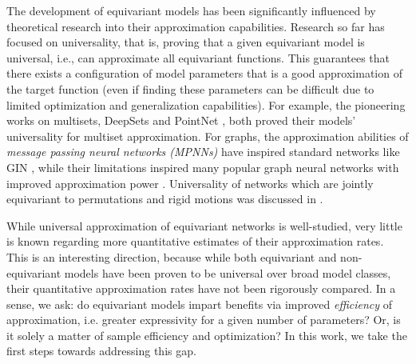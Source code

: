 \documentclass[twoside,11pt]{article}
\newcommand{\hl}[1]{\textcolor{blue}{#1}}
\begin{document}
The development of equivariant models has been significantly influenced by theoretical research into their approximation capabilities. Research so far has focused on universality, that is,   %
proving that a given equivariant model is universal, i.e., can approximate all equivariant functions. This guarantees that there exists a configuration of model parameters that is a good approximation of the target function (even if finding these parameters can be difficult due to limited optimization and generalization capabilities).  For example,  the pioneering works on multisets, DeepSets \citep{zaheer2017deep} and PointNet \citep{pointnet}, both proved their models' universality for multiset approximation. For graphs, the approximation abilities of \emph{message passing neural networks (MPNNs)} have inspired standard networks like GIN \citep{xu2018how}, while their limitations inspired many popular graph neural networks with improved approximation power \citep{goes,ppgn, NEURIPS2019_ea9268cb}. Universality of networks which are jointly equivariant to permutations and rigid motions was discussed in  \cite{dymuniversality,hordan2024complete,delle2024three,hordanweisfeiler,li2025on}. 

While universal approximation of equivariant networks is well-studied, very little is known regarding more quantitative estimates of their approximation rates. This is an interesting direction, because while both equivariant and non-equivariant models have been proven to be universal over broad model classes, their quantitative approximation rates have not been rigorously compared. In a sense, we ask: do equivariant models impart benefits via improved \emph{efficiency} of approximation, i.e. greater expressivity for a given number of parameters? Or, is it solely a matter of sample efficiency and optimization? In this work, we take the first steps towards addressing this gap. 
\end{document}
